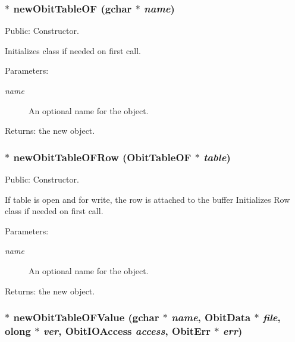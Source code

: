\subsubsection{$\ast$ new\-Obit\-Table\-OF (gchar $\ast$ {\em name})}\label{ObitTableOF_8c_a16}


Public: Constructor. 

Initializes class if needed on first call. \begin{Desc}
\item[Parameters:]
\begin{description}
\item[{\em name}]An optional name for the object. \end{description}
\end{Desc}
\begin{Desc}
\item[Returns:]the new object. \end{Desc}
\subsubsection{$\ast$ new\-Obit\-Table\-OFRow ({\bf Obit\-Table\-OF} $\ast$ {\em table})}\label{ObitTableOF_8c_a14}


Public: Constructor. 

If table is open and for write, the row is attached to the buffer Initializes Row class if needed on first call. \begin{Desc}
\item[Parameters:]
\begin{description}
\item[{\em name}]An optional name for the object. \end{description}
\end{Desc}
\begin{Desc}
\item[Returns:]the new object. \end{Desc}
\subsubsection{$\ast$ new\-Obit\-Table\-OFValue (gchar $\ast$ {\em name}, {\bf Obit\-Data} $\ast$ {\em file}, {\bf olong} $\ast$ {\em ver}, Obit\-IOAccess {\em access}, {\bf Obit\-Err} $\ast$ {\em err})}\label{ObitTableOF_8c_a18}


